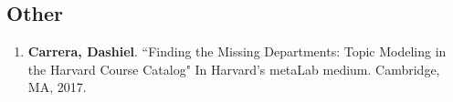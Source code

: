 \subsection{Other}
\begin{enumerate}
\item \textbf{Carrera, Dashiel}. ``Finding the Missing Departments: Topic Modeling in the Harvard Course Catalog" In Harvard's metaLab medium. Cambridge, MA, 2017.\\
\end{enumerate} 



